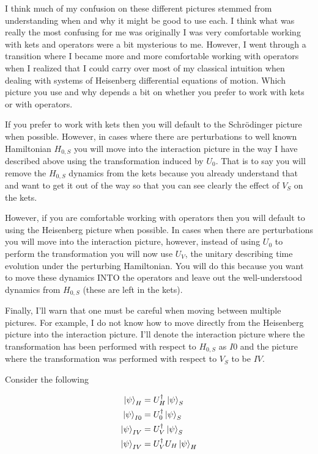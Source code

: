 \documentclass[12pt]{article}
\begin{document}
I think much of my confusion on these different pictures stemmed from understanding when and why it might be good to use each. I think what was really the most confusing for me was originally I was very comfortable working with kets and operators were a bit mysterious to me. However, I went through a transition where I became more and more comfortable working with operators when I realized that I could carry over most of my classical intuition when dealing with systems of Heisenberg differential equations of motion. Which picture you use and why depends a bit on whether you prefer to work with kets or with operators.

If you prefer to work with kets then you will default to the Schr{\"o}dinger picture when possible. However, in cases where there are perturbations to well known Hamiltonian $H_{0,S}$ you will move into the interaction picture in the way I have described above using the transformation induced by $U_0$. That is to say you will remove the $H_{0,S}$ dynamics from the kets because you already understand that and want to get it out of the way so that you can see clearly the effect of $V_S$ on the kets.

However, if you are comfortable working with operators then you will default to using the Heisenberg picture when possible. In cases when there are perturbations you will move into the interaction picture, however, instead of using $U_0$ to perform the transformation you will now use $U_V$, the unitary describing time evolution under the perturbing Hamiltonian. You will do this because you want to move these dynamics INTO the operators and leave out the well-understood dynamics from $H_{0,S}$ (these are left in the kets).

Finally, I'll warn that one must be careful when moving between multiple pictures. For example, I do not know how to move directly from the Heisenberg picture into the interaction picture. I'll denote the interaction picture where the transformation has been performed with respect to $H_{0,S}$ as $I0$ and the picture where the transformation was performed with respect to $V_S$ to be $IV$.

Consider the following

\begin{align}
\ket{\psi}_H &= U_H^{\dag} \ket{\psi}_S\\
\ket{\psi}_{I0} &= U_0^{\dag} \ket{\psi}_S\\
\ket{\psi}_{IV} &= U_V^{\dag} \ket{\psi}_S\\
\ket{\psi}_{IV} &= U_V^{\dag} U_H \ket{\psi}_H\\
\end{align}
\end{document}
